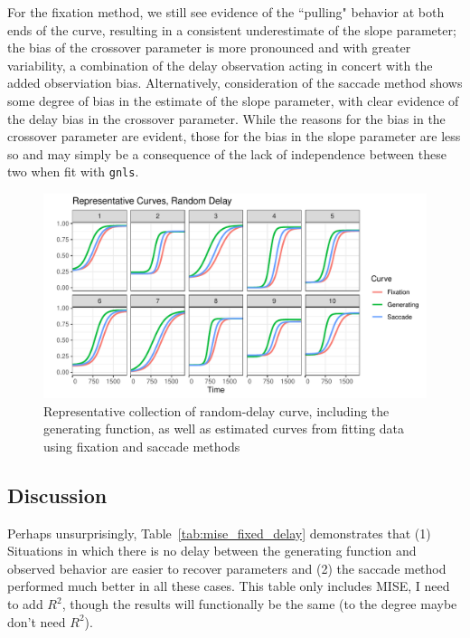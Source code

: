 \documentclass{article}
\newcommand{\xt}{\texttt}%
\begin{document}
For the fixation method, we still see evidence of the ``pulling" behavior at both ends of the curve, resulting in a consistent underestimate of the slope parameter; the bias of the crossover parameter is more pronounced and with greater variability, a combination of the delay observation acting in concert with the added observiation bias. Alternatively, consideration of the saccade method shows some degree of bias in the estimate of the slope parameter, with clear evidence of the delay bias in the crossover parameter. While the reasons for the bias in the crossover parameter are evident, those for the bias in the slope parameter are less so and may simply be a consequence of the lack of independence between these two when fit with \xt{gnls}.




\begin{figure}[H]
\centering
\includegraphics{random_pb_curves.pdf}
\caption{Representative collection of random-delay curve, including  the generating function, as well as estimated curves from fitting data using fixation and saccade methods}
\label{fig:random_pb_curves}
\end{figure}

\subsection{Discussion}

Perhaps unsurprisingly, Table~\ref{tab:mise_fixed_delay} demonstrates that (1) Situations in which there is no delay between the generating function and observed behavior are easier to recover parameters and (2) the saccade method performed much better in all these cases. This table only includes MISE, I need to add $R^2$, though the results will functionally be the same (to the degree maybe don't need $R^2$).
\end{document}
